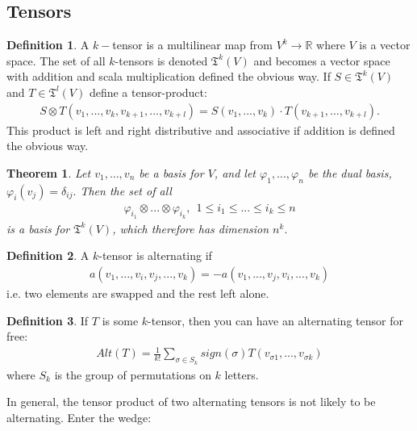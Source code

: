 \documentclass[20pt]{article}
\theoremstyle{plain}
\newtheorem{theorem}{Theorem}
\theoremstyle{definition}
\newtheorem{definition}{Definition}
\newcommand{\reals}{\mathbb{R}}
\begin{document}
\subsection{Tensors}
\begin{definition}
  A $k-$tensor is a multilinear map from
  $V^k \to \reals$ where $V$ is a vector space.
  The set of all $k$-tensors is denoted $\mathfrak{T}^k(V)$ and becomes a vector space
  with addition and scala multiplication defined the obvious way.
  If $S \in \mathfrak{T}^k(V)$ and $T \in \mathfrak{T}^l(V)$
  define a tensor-product:
  \begin{align*}
    S \otimes T (v_1, ..., v_k, v_{k+1}, ..., v_{k+l}) =
    S(v_1, ..., v_k)\cdot T(v_{k+1}, ..., v_{k+l}).
  \end{align*}
  This product is left and right distributive and associative if addition is defined the obvious way.
\end{definition}

\begin{theorem}
  Let $v_1, ..., v_n$ be a basis for $V$, and let
  $\varphi_1, ..., \varphi_n$ be the dual basis, $\varphi_i(v_j) = \delta_{ij}.$
  Then the set of all
  \begin{align*}
    \varphi_{i_1} \otimes ... \otimes \varphi_{i_k}, \ \ 1 \leq i_1 \leq ... \leq i_k \leq n
  \end{align*}
  is a basis for $\mathfrak{T}^k(V)$, which therefore has dimension $n^k.$
\end{theorem}


\begin{definition}
  A $k$-tensor is alternating if
  \begin{align*}
    a(v_1, ..., v_i, v_j, ..., v_k) = -a(v_1, ..., v_j, v_i, ..., v_k)
  \end{align*}
  i.e. two elements are swapped and the rest left alone.
\end{definition}


\begin{definition}
  If $T$ is some $k$-tensor,
  then you can have an alternating tensor for free:
  \begin{align*}
    Alt(T) = \frac{1}{k!}\sum_{\sigma \in S_k} sign(\sigma)
      T(v_{\sigma1}, ..., v_{\sigma k})
  \end{align*}
  where $S_k$ is the group of permutations on $k$ letters.
\end{definition}

In general, the tensor product of two alternating tensors is not likely to be alternating.  Enter the wedge:
\end{document}
